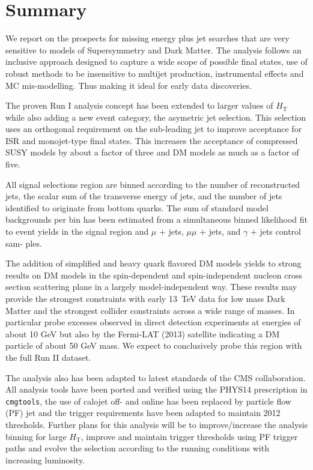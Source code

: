 \section{Summary}
\label{sec:summary}

We report on the prospects for missing energy plus jet searches that are very sensitive to 
 models of Supersymmetry and Dark Matter. The analysis follows an inclusive approach designed to 
capture a wide scope of possible final states, use of robust methods to be insensitive to multijet production,
instrumental effects and MC mis-modelling. Thus making it ideal for early data discoveries.

The proven Run I analysis concept has been extended to larger values of $H_\textrm{T}$ while also adding a new event category,
the asymetric jet selection. This selection uses an orthogonal requirement on the sub-leading jet to improve 
acceptance for ISR and monojet-type final states. This increases the acceptance of compressed SUSY models by about a factor of three
and DM models as much as a factor of five.

All signal selections region are binned according to the number of reconstructed jets, the scalar sum of the
transverse energy of jets, and the number of jets identified to originate from bottom quarks. The
sum of standard model backgrounds per bin has been estimated from a simultaneous binned
likelihood fit to event yields in the signal region and $\mu$ + jets, $\mu\mu$ + jets, and $\gamma$ + jets control sam-
ples. 

The addition of simplified and heavy quark flavored DM models yields to strong results on DM models in the spin-dependent and spin-independent nucleon cross section scattering plane in a largely model-independent way. These results may provide the strongest constraints with early 13~TeV data for low mass Dark Matter and the strongest collider constraints across a wide range of masses. In particular probe excesses observed in direct detection experiments at energies of about 10 GeV but also by the Fermi-LAT (2013) satellite indicating a DM particle of about 50 GeV mass. We expect to conclusively probe this region with the full Run II dataset.


The analysis also has been adapted to latest standards of the CMS collaboration. All analysis tools have been ported and verified using the \textsc{PHYS14} prescription in {\tt cmgtools}, the use of calojet off- and online has been replaced by particle flow (PF) jet and the trigger requirements have been adapted to maintain 2012 thresholds.
Further plans for this analysis will be to improve/increase the analysis binning for large $H_\textrm{T}$, improve and maintain trigger thresholds using PF trigger paths and evolve the selection according to the running conditions with increasing luminosity.


